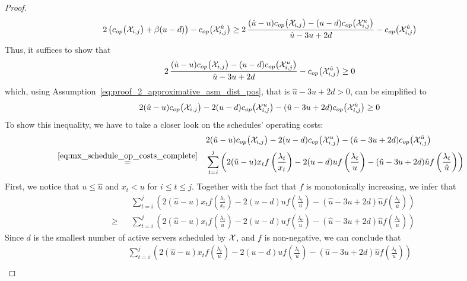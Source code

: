 \begin{proof}
\begin{align*}
	2\left(c_{op}\bigl(\mathcal{X}_{i,j}\bigr)+\beta(u-d)\right)-c_{op}\bigl(\mathcal{X}_{i,j}^{\hat{u}}\bigr)\ge2\,\frac{(\hat{u}-u)c_{op}\bigl(\mathcal{X}_{i,j}\bigr)-(u-d)c_{op}\bigl(\mathcal{X}_{i,j}^u\bigr)}{\hat{u}-3u+2d}-c_{op}\bigl(\mathcal{X}_{i,j}^{\hat{u}}\bigr)
\end{align*}
Thus, it suffices to show that
\begin{align*}
	2\,\frac{(\hat{u}-u)c_{op}\bigl(\mathcal{X}_{i,j}\bigr)-(u-d)c_{op}\bigl(\mathcal{X}_{i,j}^u\bigr)}{\hat{u}-3u+2d}-c_{op}\bigl(\mathcal{X}_{i,j}^{\hat{u}}\bigr)\ge 0
\end{align*}
which, using Assumption~\eqref{eq:proof_2_approximative_asm_dist_pos}, that is $\hat{u}-3u+2d>0$, can be simplified to
\begin{equation*}
	2(\hat{u}-u)c_{op}\bigl(\mathcal{X}_{i,j}\bigr)-2(u-d)c_{op}\bigl(\mathcal{X}_{i,j}^u\bigr)-(\hat{u}-3u+2d)c_{op}\bigl(\mathcal{X}_{i,j}^{\hat{u}}\bigr)\ge 0
\end{equation*}
To show this inequality, we have to take a closer look on the schedules' operating costs:
\begin{align*}
	&&&2(\hat{u}-u)c_{op}\bigl(\mathcal{X}_{i,j}\bigr)-2(u-d)c_{op}\bigl(\mathcal{X}_{i,j}^u\bigr)-(\hat{u}-3u+2d)c_{op}\bigl(\mathcal{X}_{i,j}^{\hat{u}}\bigr)\\
	&\stackrel{\eqref{eq:mx_schedule_op_costs_complete}}{=}&&\sum\limits_{t=i}^j\left(2(\hat{u}-u)x_tf\left(\frac{\lambda_t}{x_t}\right)-2(u-d)uf\left(\frac{\lambda_t}{u}\right)-(\hat{u}-3u+2d)\hat{u}f\left(\frac{\lambda_t}{\hat{u}}\right)\right)
\end{align*}
First, we notice that $u\le\hat{u}$ and $x_t<u$ for $i\le t\le j$. Together with the fact that $f$ is monotonically increasing, we infer that
\begin{align*}
	&&&\sum\limits_{t=i}^j\left(2(\hat{u}-u)x_tf\left(\frac{\lambda_t}{x_t}\right)-2(u-d)uf\left(\frac{\lambda_t}{u}\right)-(\hat{u}-3u+2d)\hat{u}f\left(\frac{\lambda_t}{\hat{u}}\right)\right)\\
	&\ge&&\sum\limits_{t=i}^j\left(2(\hat{u}-u)x_tf\left(\frac{\lambda_t}{u}\right)-2(u-d)uf\left(\frac{\lambda_t}{u}\right)-(\hat{u}-3u+2d)\hat{u}f\left(\frac{\lambda_t}{u}\right)\right)
\end{align*}
Since $d$ is the smallest number of active servers scheduled by $\mathcal{X}$, and $f$ is non-negative, we can conclude that
\begin{align*}
	&&&\sum\limits_{t=i}^j\left(2(\hat{u}-u)x_tf\left(\frac{\lambda_t}{u}\right)-2(u-d)uf\left(\frac{\lambda_t}{u}\right)-(\hat{u}-3u+2d)\hat{u}f\left(\frac{\lambda_t}{u}\right)\right)\\

\end{align*}
\end{proof}
